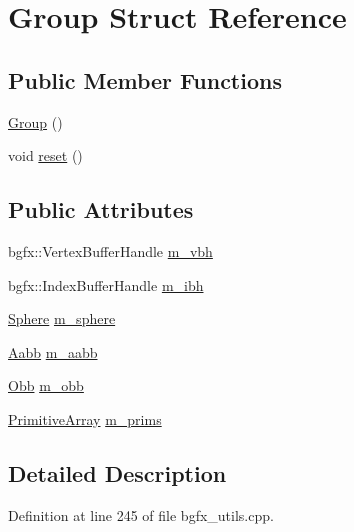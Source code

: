 \hypertarget{struct_group}{\section{Group Struct Reference}
\label{struct_group}
}
\subsection*{Public Member Functions}
\begin{DoxyCompactItemize}
\item 
\hyperlink{struct_group_a7b74f9ac68e0504ccf2e2854b7355ff1}{Group} ()
\item 
void \hyperlink{struct_group_a5b33c3d4bf59055c8777b37c1091f999}{reset} ()
\end{DoxyCompactItemize}
\subsection*{Public Attributes}
\begin{DoxyCompactItemize}
\item 
bgfx\+::\+Vertex\+Buffer\+Handle \hyperlink{struct_group_acdc9cdc7dba88683905bec591763eaf8}{m\+\_\+vbh}
\item 
bgfx\+::\+Index\+Buffer\+Handle \hyperlink{struct_group_a7e9013fc37976b5cd6a2c4f77fd8a972}{m\+\_\+ibh}
\item 
\hyperlink{struct_sphere}{Sphere} \hyperlink{struct_group_a1b2aca67af27c4d036dc8b1e3c424ae1}{m\+\_\+sphere}
\item 
\hyperlink{struct_aabb}{Aabb} \hyperlink{struct_group_ae94cf4aad294510287a64bf392c18ee6}{m\+\_\+aabb}
\item 
\hyperlink{struct_obb}{Obb} \hyperlink{struct_group_a91c5eebd60cd5bea644020ac0dff47e9}{m\+\_\+obb}
\item 
\hyperlink{bgfx__utils_8cpp_abac1e58aea522298a661dd5a89dfb1f8}{Primitive\+Array} \hyperlink{struct_group_aa296b3c707e5db98c811f52942e59517}{m\+\_\+prims}
\end{DoxyCompactItemize}


\subsection{Detailed Description}


Definition at line 245 of file bgfx\+\_\+utils.\+cpp.



